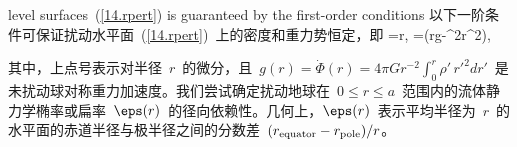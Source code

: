 level surfaces~(\ref{14.rpert}) is guaranteed by the first-order
conditions
\fi
以下一阶条件可保证扰动水平面~(\ref{14.rpert})~上的密度和重力势恒定，即
\eq
\delta\hspace{-0.2 mm}\rho=\twothirds r\eps\dot{\rho},
\qquad
\delta\Phi=\twothirds(r\eps g-\half\Om^2r^2),
\label{eq:14.dPhi}
\en

其中，上点号表示对半径~$r$~的微分，且~$g(r)=\dot{\Phi}(r)=4\pi Gr^{-2}\int _0^r\rho'\,{r'}^2dr'$~是未扰动球对称重力加速度。我们尝试确定扰动地球在~$0\leq r\leq a$~范围内的流体静力学椭率或扁率~$\eps(r)$~的径向依赖性。几何上，$\eps(r)$~表示平均半径为~$r$~的水平面的赤道半径与极半径之间的分数差~$(r_{\rm equator}-r_{\rm pole})/r$。

